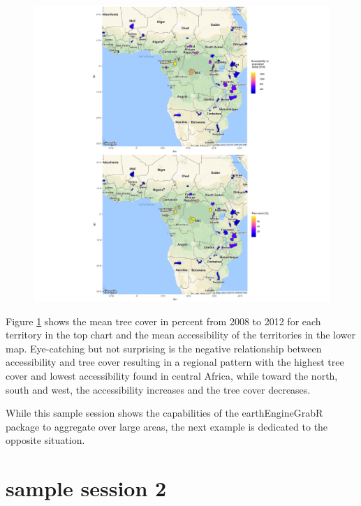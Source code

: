 \begin{center}
	\begin{figure}[h]
		\begin{center}
			\includegraphics[width=16cm]{images/sample_session_1.pdf}
			\label{sample_session_1}
		\end{center}
	\end{figure}
\end{center}


Figure \ref{sample_session_1} shows the mean tree cover in percent from 2008 to 2012 for each territory in the top chart and the mean accessibility of the territories in the lower map. Eye-catching but not surprising is the negative relationship between accessibility and tree cover resulting in a regional pattern with the highest tree cover and lowest accessibility found in central Africa, while toward the north, south and west, the accessibility increases and the tree cover decreases.

While this sample session shows the capabilities of the earthEngineGrabR package to aggregate over large areas, the next example is dedicated to the opposite situation. 

\section{sample session 2}

